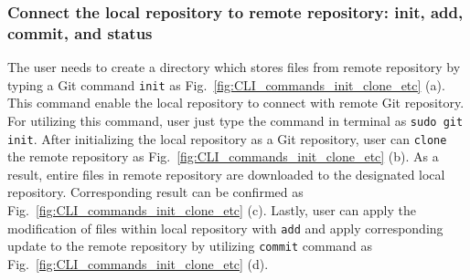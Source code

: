 \documentclass{article}
\begin{document}
\subsubsection{Connect the local repository to remote repository: init, add, commit, and status}
\hspace*{2mm}The user needs to create a directory which stores files from remote repository by typing a Git command \texttt{init} as Fig.~\ref{fig:CLI_commands_init_clone_etc} (a). This command enable the local repository to connect with remote Git repository. For utilizing this command, user just type the command in terminal as \texttt{sudo git init}. After initializing the local repository as a Git repository, user can \texttt{clone} the remote repository as Fig.~\ref{fig:CLI_commands_init_clone_etc} (b). As a result, entire files in remote repository are downloaded to the designated local repository. Corresponding result can be confirmed as Fig.~\ref{fig:CLI_commands_init_clone_etc} (c). Lastly, user can apply the modification of files within local repository with \texttt{add} and apply corresponding update to the remote repository by utilizing \texttt{commit} command as Fig.~\ref{fig:CLI_commands_init_clone_etc} (d). 
\end{document}
